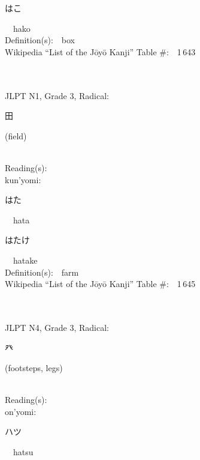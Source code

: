 \begin{multicols}{2}
{\hspace*{2em}}{\begin{CJK}{UTF8}{min} はこ \end{CJK}}\ \ hako\ \ \\
Definition(s):\ \ box \\
Wikipedia ``List of the J\=oy\=o Kanji'' Table \#:\ \ 1\,643 \\
\ \ \\
{\fontsize{34pt}{40pt}  }\ \ \\  %
{JLPT N1, Grade 3, Radical:\ \ {\begin{CJK}{UTF8}{min} 田 \end{CJK}} (field) } \\
Reading(s):\ \ \\
{\hspace*{1em}}kun'yomi:\ \ \\
{\hspace*{2em}}{\begin{CJK}{UTF8}{min} はた \end{CJK}}\ \ hata\ \ \\
{\hspace*{2em}}{\begin{CJK}{UTF8}{min} はたけ \end{CJK}}\ \ hatake\ \ \\
Definition(s):\ \ farm \\
Wikipedia ``List of the J\=oy\=o Kanji'' Table \#:\ \ 1\,645 \\
\ \ \\
{\fontsize{34pt}{40pt}  }\ \ \\  %
{JLPT N4, Grade 3, Radical:\ \ {\begin{CJK}{UTF8}{min} 癶 \end{CJK}} (footsteps, legs) } \\
Reading(s):\ \ \\
{\hspace*{1em}}on'yomi:\ \ \\
{\hspace*{2em}}{\begin{CJK}{UTF8}{min} ハツ \end{CJK}}\ \ hatsu\ \ \\

\end{multicols}
